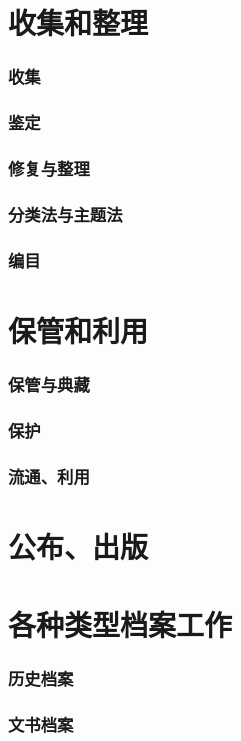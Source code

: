 \documentclass[UTF8]{../../ApplicationUniverse}
\begin{document}
\section{收集和整理}
    \subsubsection{收集}
    \subsubsection{鉴定}
    \subsubsection{修复与整理}
    \subsubsection{分类法与主题法}
    \subsubsection{编目}
\section{保管和利用}
    \subsubsection{保管与典藏}
    \subsubsection{保护}
    \subsubsection{流通、利用}
\section{公布、出版}
\section{各种类型档案工作}
    \subsubsection{历史档案}
    \subsubsection{文书档案}
\end{document}
